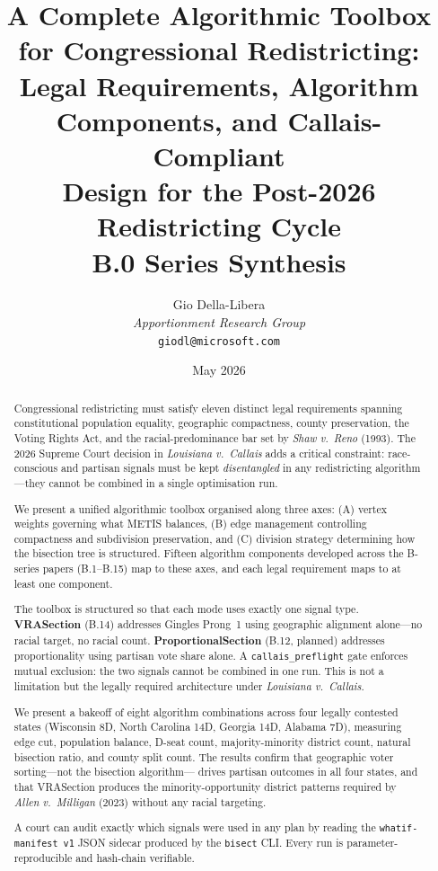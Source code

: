 \documentclass[12pt]{article}
\title{\textbf{A Complete Algorithmic Toolbox for Congressional Redistricting:\\
       Legal Requirements, Algorithm Components, and Callais-Compliant\\
       Design for the Post-2026 Redistricting Cycle}\\[0.5em]
       \large B.0 Series Synthesis}
\author{%
  Gio Della-Libera\\
  \textit{Apportionment Research Group}\\
  \small\texttt{giodl@microsoft.com}
}
\date{May 2026}
\newcommand{\case}[1]{\textit{#1}}
\newcommand{\callais}{\case{Louisiana v.\ Callais}}
\newcommand{\shaw}{\case{Shaw v.\ Reno}}
\newcommand{\allenmilligan}{\case{Allen v.\ Milligan}}
\begin{document}
\maketitle

\begin{abstract}
Congressional redistricting must satisfy eleven distinct legal requirements
spanning constitutional population equality, geographic compactness, county
preservation, the Voting Rights Act, and the racial-predominance bar set by
\shaw{} (1993).
The 2026 Supreme Court decision in \callais{} adds a critical constraint:
race-conscious and partisan signals must be kept \emph{disentangled} in any
redistricting algorithm---they cannot be combined in a single optimisation run.

We present a unified algorithmic toolbox organised along three axes:
(A) vertex weights governing what METIS balances,
(B) edge management controlling compactness and subdivision preservation, and
(C) division strategy determining how the bisection tree is structured.
Fifteen algorithm components developed across the B-series papers (B.1--B.15)
map to these axes, and each legal requirement maps to at least one component.

The toolbox is structured so that each mode uses exactly one signal type.
\textbf{VRASection} (B.14) addresses Gingles Prong~1 using geographic alignment
alone---no racial target, no racial count.
\textbf{ProportionalSection} (B.12, planned) addresses proportionality using
partisan vote share alone.
A \texttt{callais\_preflight} gate enforces mutual exclusion: the two signals
cannot be combined in one run.
This is not a limitation but the legally required architecture under \callais{}.

We present a bakeoff of eight algorithm combinations across four legally
contested states (Wisconsin 8D, North Carolina 14D, Georgia 14D,
Alabama 7D), measuring edge cut, population balance, D-seat count,
majority-minority district count, natural bisection ratio, and county split count.
The results confirm that geographic voter sorting---not the bisection algorithm---
drives partisan outcomes in all four states, and that VRASection produces the
minority-opportunity district patterns required by \allenmilligan{} (2023)
without any racial targeting.

A court can audit exactly which signals were used in any plan by reading the
\texttt{whatif-manifest v1} JSON sidecar produced by the \texttt{bisect} CLI.
Every run is parameter-reproducible and hash-chain verifiable.
\end{abstract}

\tableofcontents
\newpage












\end{document}
